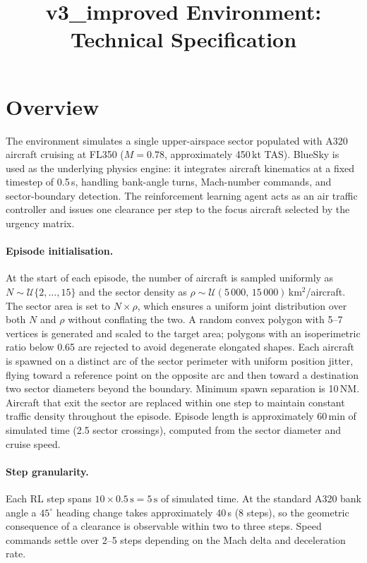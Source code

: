 \documentclass[11pt, a4paper]{article}
\title{\textbf{v3\_improved Environment: Technical Specification}}
\author{}
\date{}
\begin{document}
\maketitle

\section{Overview}

The environment simulates a single upper-airspace sector populated with A320
aircraft cruising at FL350 ($M = 0.78$, approximately 450\,kt TAS).
BlueSky is used as the underlying physics engine: it integrates aircraft
kinematics at a fixed timestep of 0.5\,s, handling bank-angle turns,
Mach-number commands, and sector-boundary detection.
The reinforcement learning agent acts as an air traffic controller and issues
one clearance per step to the focus aircraft selected by the urgency matrix.

\paragraph{Episode initialisation.}
At the start of each episode, the number of aircraft is sampled uniformly as
$N \sim \mathcal{U}\{2,\ldots,15\}$ and the sector density as
$\rho \sim \mathcal{U}(5\,000,\,15\,000)$\,km$^2$/aircraft.
The sector area is set to $N \times \rho$, which ensures a uniform joint
distribution over both $N$ and $\rho$ without conflating the two.
A random convex polygon with 5--7 vertices is generated and scaled to the
target area; polygons with an isoperimetric ratio below 0.65 are rejected to
avoid degenerate elongated shapes.
Each aircraft is spawned on a distinct arc of the sector perimeter with
uniform position jitter, flying toward a reference point on the opposite arc
and then toward a destination two sector diameters beyond the boundary.
Minimum spawn separation is 10\,NM.
Aircraft that exit the sector are replaced within one step to maintain constant
traffic density throughout the episode.
Episode length is approximately 60\,min of simulated time (2.5 sector crossings),
computed from the sector diameter and cruise speed.

\paragraph{Step granularity.}
Each RL step spans $10 \times 0.5\,\text{s} = 5\,\text{s}$ of simulated time.
At the standard A320 bank angle a $45^\circ$ heading change takes approximately
40\,s (8 steps), so the geometric consequence of a clearance is observable
within two to three steps.
Speed commands settle over 2--5 steps depending on the Mach delta and
deceleration rate.
\end{document}
